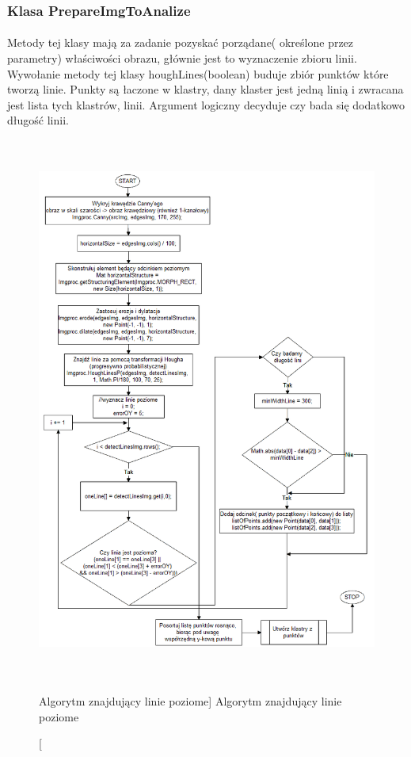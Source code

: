 \documentclass[a4paper,12pt]{article}
\begin{document}
		\subsubsection{Klasa PrepareImgToAnalize}
	        \paragraph{} Metody tej klasy mają za zadanie pozyskać porządane( określone     przez parametry) właściwości obrazu, głównie jest to wyznaczenie zbioru     linii. Wywołanie metody tej klasy houghLines(boolean) buduje zbiór          punktów  które tworzą linie. Punkty są łaczone w klastry, dany klaster      jest jedną linią i zwracana jest lista tych klastrów, linii. Argument       logiczny decyduje czy bada się dodatkowo długość linii.
    		
    		    \newpage
    			\begin{figure}[!ht]  
    		        \begin{center}
    		    	    \includegraphics[height=18cm, width=15cm]{image//algorithm//prepareImgToAnalize.png} 
    			    \end{center}
    		    	\caption
        	    		[Algorytm znajdujący linie poziome]  
            			{Algorytm znajdujący linie poziome}  
    		    \end{figure}	
				
\end{document}
